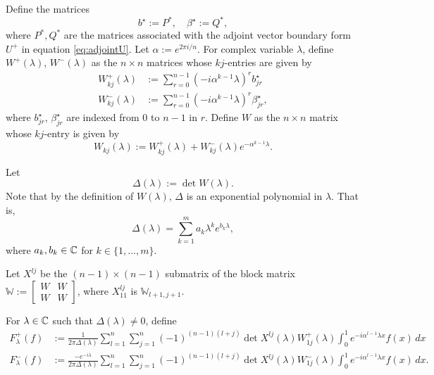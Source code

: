 \documentclass[12pt, oneside, a4paper]{article}
\begin{document}
Define the matrices 
\[b^\star := P^*,\quad \beta^\star := Q^*,\]
where $P^*, Q^*$ are the matrices associated with the adjoint vector boundary form $U^+$ in equation \ref{eq:adjointU}.
Let $\alpha := e^{2\pi i/n}$. For complex variable $\lambda$, define $W^+(\lambda)$, $W^-(\lambda)$ as the $n\times n$ matrices whose $kj$-entries are given by
\begin{subequations}\label{eq:M+/-}
    \begin{align}
        W^+_{kj}(\lambda) &:= \sum_{r=0}^{n-1}(-i\alpha^{k-1}\lambda)^r b^\star_{jr}\label{eq:M+}\\
        W^-_{kj}(\lambda) &:= \sum_{r=0}^{n-1}(-i\alpha^{k-1}\lambda)^r \beta^\star_{jr},\label{eq:M-}
    \end{align}
\end{subequations}
where $b^\star_{jr}$, $\beta^\star_{jr}$ are indexed from $0$ to $n-1$ in $r$. Define $W$ as the $n\times n$ matrix whose $kj$-entry is given by
\begin{equation}\label{eq:M}
    W_{kj}(\lambda) := W^+_{kj}(\lambda) + W^-_{kj}(\lambda)e^{-\alpha^{k-1}\lambda}.
\end{equation}

Let
\begin{equation}\label{eq:delta}
    \Delta(\lambda):=\det W(\lambda).
\end{equation}
Note that by the definition of $W(\lambda)$, $\Delta$ is an exponential polynomial in $\lambda$. That is,
\[\Delta(\lambda) = \sum_{k=1}^m a_k \lambda^k e^{b_k\lambda},\]
where $a_k, b_k\in\mathbb C$ for $k\in\{1,\ldots,m\}$.

Let $X^{lj}$ be the $(n-1)\times (n-1)$ submatrix of the block matrix $\mathbb{W}:=\begin{bmatrix}W & W\\ W & W\end{bmatrix}$, where $X^{lj}_{11}$ is $\mathbb{W}_{l+1, j+1}$.

For $\lambda\in\mathbb C$ such that $\Delta(\lambda)\neq 0$, define
\begin{subequations}\label{eq:F_lambda_+-}
    \begin{align}
        F^+_\lambda(f) &:= \frac{1}{2\pi \Delta(\lambda)} \sum_{l=1}^n\sum_{j=1}^n(-1)^{(n-1)(l+j)}\det X^{lj}(\lambda)W^+_{1j}(\lambda)\int_0^1 e^{-i\alpha^{l-1}\lambda x}f(x)\,dx \label{eq:F+}\\
        F^-_\lambda(f) &:= \frac{-e^{-i\lambda}}{2\pi \Delta(\lambda)} \sum_{l=1}^n\sum_{j=1}^n(-1)^{(n-1)(l+j)}\det X^{lj}(\lambda)W^-_{1j}(\lambda)\int_0^1 e^{-i\alpha^{l-1}\lambda x}f(x)\,dx. \label{eq:F-}
    \end{align}
\end{subequations}
\end{document}
